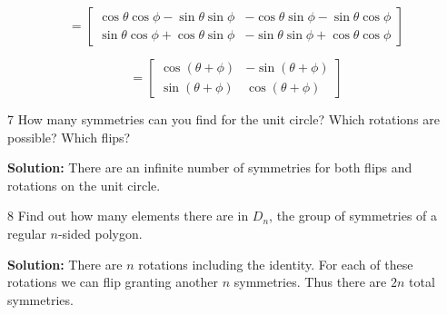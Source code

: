 \[
=
\begin{bmatrix}
\cos\theta \cos\phi - \sin\theta \sin\phi & -\cos\theta \sin\phi - \sin\theta \cos\phi \\
\sin\theta \cos\phi + \cos\theta \sin\phi & -\sin\theta \sin\phi + \cos\theta \cos\phi
\end{bmatrix}
\]

\[
=
\begin{bmatrix}
\cos(\theta+\phi) & -\sin(\theta+\phi) \\
\sin(\theta+\phi) & \cos(\theta+\phi)
\end{bmatrix}
\]

\begin{problem}{7}
    How many symmetries can you find for the unit circle?
    Which rotations are possible?
    Which flips?
\end{problem}
\solved

\textbf{Solution:} There are an infinite number of 
symmetries for both flips and rotations on the unit circle.

\begin{problem}{8}
    Find out how many elements there are in $D_n$,
    the group of symmetries of a regular $n$-sided 
    polygon.
\end{problem}
\solved

\textbf{Solution:}
There are $n$ rotations including the identity.
For each of these rotations we can flip granting another $n$ symmetries.
Thus there are $2n$ total symmetries.

